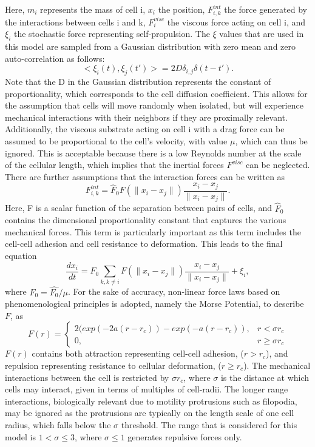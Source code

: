 \documentclass[12pt,letterpaper,cm]{article}
\renewcommand{\.}{\cdot}
\newcommand{\<}{\langle}
\renewcommand{\>}{\rangle}
\begin{document}
	Here, $m_i$ represents the mass of cell i, $x_i$ the position, $F^{int}_{i,k}$ the force generated by the interactions between cells i and k, $F^{visc}_i$ the viscous force acting on cell i, and $\xi_i$ the stochastic force representing self-propulsion.  The $\xi$ values that are used in this model are sampled from a Gaussian distribution with zero mean and zero auto-correlation as follows:
	\[
	<\xi_i(t),\xi_j(t')>=2D\delta_{i,j}\delta(t-t').
	\] 
	Note that the D in the Gaussian distribution represents the constant of proportionality, which corresponds to the cell diffusion coefficient.  This allows for the assumption that cells will move randomly when isolated, but will experience mechanical interactions with their neighbors if they are proximally relevant.  Additionally, the viscous substrate acting on cell i with a drag force can be assumed to be proportional to the cell's velocity, with value $\mu$, which can thus be ignored.  This is acceptable because there is a low Reynolds number at the scale of the cellular length, which implies that the inertial forces $F^{visc}$ can be neglected.  There are further assumptions that the interaction forces can be written as 
	\[
	F^{int}_{i,k}=\hat{F}_0 F \left( \lVert x_i -x_j \rVert \right) \frac{x_i -x_j}{\lVert x_i -x_j \rVert}.
	\]
	Here, F is a scalar function of the separation between pairs of cells, and $\hat{F}_0$ contains the dimensional proportionality constant that captures the various mechanical forces.  This term is particularly important as this term includes the cell-cell adhesion and cell resistance to deformation.  This leads to the final equation
	\[
	\frac{dx_i}{dt}=F_0 \sum_{k,k\neq i} F \left( \lVert x_i -x_j \rVert \right) \frac{x_i -x_j}{\lVert x_i -x_j \rVert} + \xi_i,
	\]
	where $F_0 =\hat{F_0}/\mu$.  For the sake of accuracy, non-linear force laws based on phenomenological principles is adopted, namely the Morse Potential, to describe $F$, as
	\[
	F(r)=\left\lbrace \begin{array}{ll}	2(exp(-2a(r-r_c))-exp(-a(r-r_c)), &r<\sigma r_c\\
	0, & r\geq \sigma r_c \end{array}\right.
	\]
	$F(r)$ contains both attraction representing cell-cell adhesion, ($r>r_c$), and repulsion representing resistance to cellular deformation, ($r\geq r_c$).  The mechanical interactions between the cell is restricted by $\sigma r_c$, where $\sigma$ is the distance at which cells may interact, given in terms of multiples of cell-radii.  The longer range interactions, biologically relevant due to motility protrusions such as filopodia, may be ignored as the protrusions are typically on the length scale of one cell radius, which falls below the $\sigma$ threshold.  The range that is considered for this model is $1<\sigma\leq 3$, where $\sigma \leq 1$ generates repulsive forces only.
	
\end{document}
